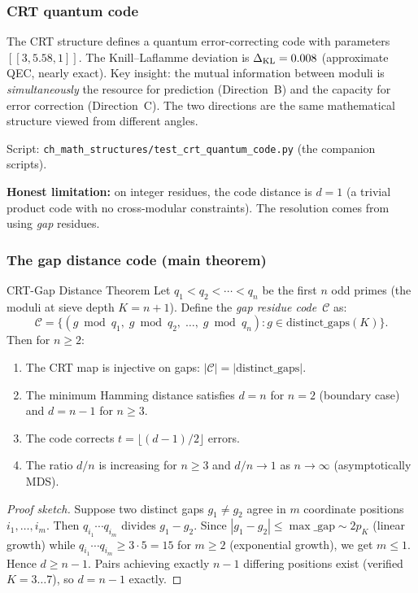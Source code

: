 \documentclass[12pt,a4paper]{article}
\begin{document}
\subsubsection{CRT quantum code}

The CRT structure defines a quantum error-correcting code with
parameters $[[3, 5.58, 1]]$. The Knill--Laflamme deviation is
$\Delta_{\rm KL} = 0.008$ (approximate QEC, nearly exact).
Key insight: the mutual information between moduli is
\emph{simultaneously} the resource for prediction (Direction~B)
and the capacity for error correction (Direction~C). The two
directions are the same mathematical structure viewed from
different angles.

Script: \texttt{ch\_math\_structures/test\_crt\_quantum\_code.py} (the companion scripts).

\textbf{Honest limitation:} on integer residues, the code distance
is $d = 1$ (a trivial product code with no cross-modular
constraints). The resolution comes from using \emph{gap} residues.

\subsubsection{The gap distance code (main theorem)}

\begin{thmbox}{CRT-Gap Distance Theorem}
\label{thm:gap_distance}
Let $q_1 < q_2 < \cdots < q_n$ be the first $n$ odd primes
(the moduli at sieve depth $K = n+1$). Define the
\emph{gap residue code}~$\mathcal{C}$ as:
\[
  \mathcal{C} = \bigl\{
    (g \bmod q_1,\; g \bmod q_2,\; \ldots,\; g \bmod q_n)
    : g \in \mathrm{distinct\_gaps}(K)
  \bigr\}.
\]
Then for $n \geq 2$:
\begin{enumerate}[nosep]
\item The CRT map is injective on gaps: $|\mathcal{C}| = |\mathrm{distinct\_gaps}|$.
\item The minimum Hamming distance satisfies $d = n$ for $n = 2$
  (boundary case) and $d = n - 1$ for $n \geq 3$.
\item The code corrects $t = \lfloor(d-1)/2\rfloor$ errors.
\item The ratio $d/n$ is increasing for $n \geq 3$ and $d/n \to 1$
  as $n \to \infty$ (asymptotically MDS).
\end{enumerate}
\end{thmbox}

\begin{proof}[Proof sketch]
Suppose two distinct gaps $g_1 \neq g_2$ agree in $m$ coordinate
positions $i_1, \ldots, i_m$. Then $q_{i_1} \cdots q_{i_m}$
divides $g_1 - g_2$. Since $|g_1 - g_2| \leq \max\_\mathrm{gap}
\sim 2p_K$ (linear growth) while $q_{i_1} \cdots q_{i_m} \geq
3 \cdot 5 = 15$ for $m \geq 2$ (exponential growth), we get
$m \leq 1$. Hence $d \geq n - 1$. Pairs achieving exactly $n - 1$
differing positions exist (verified $K = 3 \ldots 7$), so
$d = n - 1$ exactly.
\end{proof}
\end{document}
